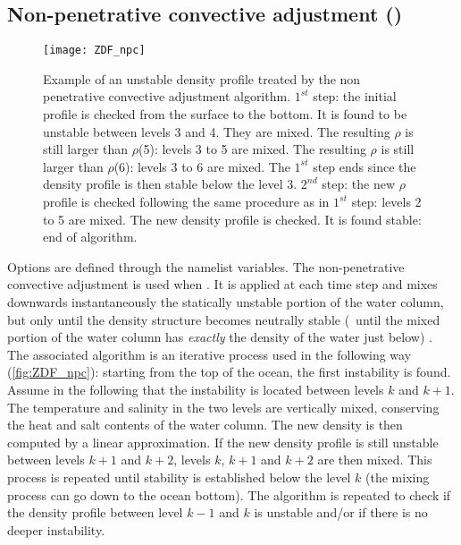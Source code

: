 \documentclass[../main/NEMO_manual]{subfiles}
\begin{document}
\subsection[Non-penetrative convective adjustment (\forcode{ln_tranpc})]{Non-penetrative convective adjustment (\protect{})}
\label{subsec:ZDF_npc}

\begin{figure}[!htb]
  \centering
  \texttt{[image: ZDF\_npc]}
  \caption[Unstable density profile treated by the non penetrative convective adjustment algorithm]{
    Example of an unstable density profile treated by
    the non penetrative convective adjustment algorithm.
    $1^{st}$ step: the initial profile is checked from the surface to the bottom.
    It is found to be unstable between levels 3 and 4.
    They are mixed.
    The resulting $\rho$ is still larger than $\rho$(5): levels 3 to 5 are mixed.
    The resulting $\rho$ is still larger than $\rho$(6): levels 3 to 6 are mixed.
    The $1^{st}$ step ends since the density profile is then stable below the level 3.
    $2^{nd}$ step: the new $\rho$ profile is checked following the same procedure as in $1^{st}$ step:
    levels 2 to 5 are mixed.
    The new density profile is checked.
    It is found stable: end of algorithm.}
  \label{fig:ZDF_npc}
\end{figure}

Options are defined through the  namelist variables.
The non-penetrative convective adjustment is used when .
It is applied at each  time step and mixes downwards instantaneously the statically unstable portion of
the water column, but only until the density structure becomes neutrally stable
(\ie\ until the mixed portion of the water column has \textit{exactly} the density of the water just below)
\citep{madec.delecluse.ea_JPO91}.
The associated algorithm is an iterative process used in the following way (\autoref{fig:ZDF_npc}):
starting from the top of the ocean, the first instability is found.
Assume in the following that the instability is located between levels $k$ and $k+1$.
The temperature and salinity in the two levels are vertically mixed, conserving the heat and salt contents of
the water column.
The new density is then computed by a linear approximation.
If the new density profile is still unstable between levels $k+1$ and $k+2$,
levels $k$, $k+1$ and $k+2$ are then mixed.
This process is repeated until stability is established below the level $k$
(the mixing process can go down to the ocean bottom).
The algorithm is repeated to check if the density profile between level $k-1$ and $k$ is unstable and/or
if there is no deeper instability.
\end{document}
